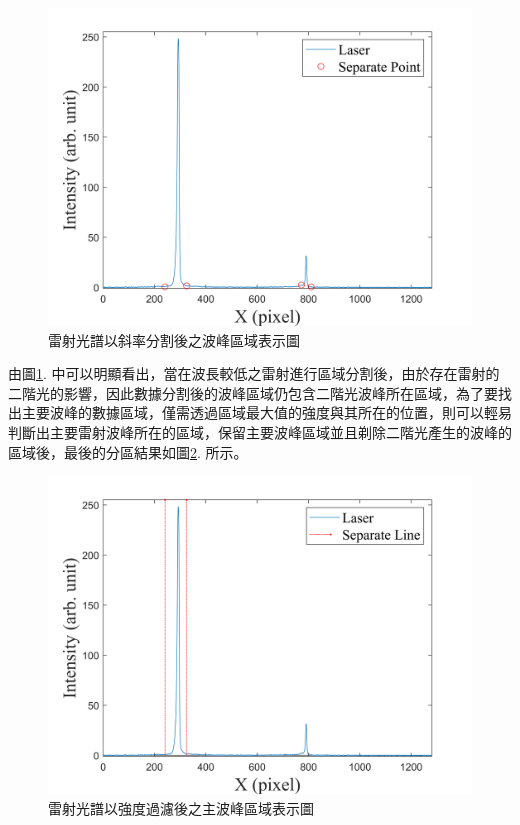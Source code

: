 \begin{figure}[H] %
	\centering %
	\includegraphics[width=14.5cm]{figures/LASER_SEP.png} %
	\caption{雷射光譜以斜率分割後之波峰區域表示圖} %
	\label{雷射光譜以斜率分割後之波峰區域表示圖} %
\end{figure}
由圖\ref{雷射光譜以斜率分割後之波峰區域表示圖}. 中可以明顯看出，當在波長較低之雷射進行區域分割後，由於存在雷射的二階光的影響，因此數據分割後的波峰區域仍包含二階光波峰所在區域，為了要找出主要波峰的數據區域，僅需透過區域最大值的強度與其所在的位置，則可以輕易判斷出主要雷射波峰所在的區域，保留主要波峰區域並且剃除二階光產生的波峰的區域後，最後的分區結果如圖\ref{雷射光譜以強度過濾後之主波峰區域表示圖}. 所示。
\begin{figure}[H] %
	\centering %
	\vspace{0.8cm}
	\includegraphics[width=16cm]{figures/laser_sep_only1area.png} %
	\caption{雷射光譜以強度過濾後之主波峰區域表示圖} %
	\label{雷射光譜以強度過濾後之主波峰區域表示圖} %
\end{figure}
